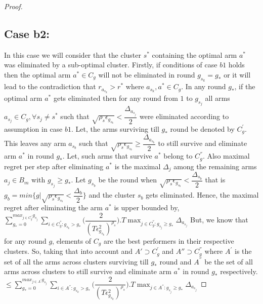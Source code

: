 \begin{proof}
\subsection{Case b2:} 
In this case we will consider that the cluster $s^{*}$ containing the optimal arm $a^{*}$ was eliminated by a sub-optimal cluster. Firstly, if conditions of case $b1$ holds then the optimal arm $a^{*}\in C_{g}$ will not be eliminated in round $g_{s_{k}}=g_{*}$ or it will lead to the contradiction that $r_{a_{s_{k}}}>r^{*}$ where $a_{s_{k}},a^{*}\in C_{g}$. In any round $g_{*}$, if the optimal arm $a^{*}$ gets eliminated then for any round from $1$ to $g_{s_{j}}$ all arms $a_{s_{j}}\in C_{g},\forall s_{j}\neq s^{*}$ such that $\sqrt{\rho_{s}\epsilon_{g_{s_{k}}}}<\dfrac{\Delta_{a_{s_{j}}}}{2}$ were eliminated according to assumption in case $b1$. Let, the arms surviving till $g_{*}$ round be denoted by $C_{g}^{'}$. This leaves any arm $a_{s_{b}}$ such that $\sqrt{\rho_{s}\epsilon_{g_{s_{b}}}}\geq\dfrac{\Delta_{a_{s_{b}}}}{2}$ to still survive and eliminate arm $a^{*}$ in round $g_{*}$. Let, such arms that survive $a^{*}$ belong to $C_{g}^{''}$. Also maximal regret per step after eliminating $a^{*}$ is the maximal $\Delta_{j}$ among the remaining arms $a_{j}\in B_{m}$ with $g_{s_{j}}\geq g_{*}$.  Let $g_{s_{b}}$ be the round when $\sqrt{\rho_{s}\epsilon_{g_{s_{b}}}}<\dfrac{\Delta_{s_{b}}}{2}$ that is $g_{b}=min\lbrace g|\sqrt{\rho_{s}\epsilon_{g_{s_{b}}}}<\dfrac{\Delta_{b}}{2}\rbrace$ and the cluster $s_{b}$ gets eliminated. Hence, the maximal regret after eliminating the arm $a^{*}$ is upper bounded by, 
\newline
$\sum_{g_{*}=0}^{max_{j\in C_{g}^{'}}g_{s_{j}}}\sum_{i\in C_{g}^{''}:g_{s_{k}}>g_{*}}\bigg(\dfrac{2}{(T\epsilon_{g_{s_{k}}}^{2})^{\rho_{s}}} \bigg).T\max_{j\in C_{g}^{''}:g_{s_{j}}\geq g_{*}}{\Delta}_{a_{s_{j}}}$
\newline
But, we know that for any round $g$, elements of $C_{g}$ are the best performers in their respective clusters. So, taking that into account and $A'\supset C_{g}^{'}$ and $A''\supset C_{g}^{''}$ where $A^{'}$ is the set of all the arms across clusters surviving till $g_{*}$ round and $A^{''}$ be the set of all arms across clusters to still survive and eliminate arm $a^{*}$ in round $g_{*}$ respectively. 
\newline
$\leq\sum_{g_{*}=0}^{max_{j\in A^{'}}g_{s_{j}}}\sum_{i\in A^{''}:g_{s_{k}}>g_{*}}\bigg(\dfrac{2}{(T\epsilon_{g_{s_{k}}}^{2})^{\rho_{s}}} \bigg).T\max_{j\in A^{''}:g_{s_{j}}\geq g_{*}}{\Delta}_{a_{s_{j}}}$
\newline

\end{proof}

